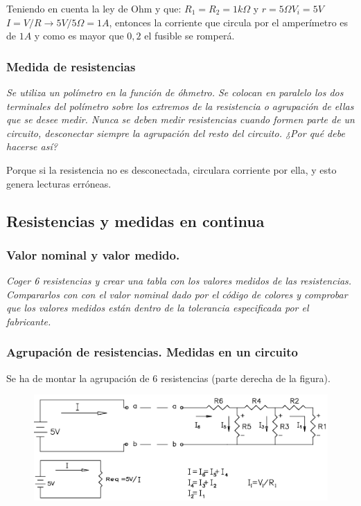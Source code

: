 \documentclass[paper=a4, fontsize=11pt]{scrartcl} %
\numberwithin{equation}{section} %
\numberwithin{figure}{section} %
\numberwithin{table}{section} %
\begin{document}
Teniendo en cuenta la ley de Ohm y que: $R_{1}=R_{2}=1k\Omega$ y $r =5\Omega V_{i}=5V$ \newline
$I=V/R \rightarrow 5V/5\Omega=1A$, entonces la corriente que circula por el amperímetro es de $1A$ y como es mayor que $0,2$ el fusible se romperá. \newline

\subsubsection{Medida de resistencias} 

\textit{Se utiliza un polímetro en la función de óhmetro. Se colocan en paralelo los dos terminales del polímetro sobre los extremos de la resistencia o agrupación de ellas que se desee medir. Nunca se deben medir resistencias cuando formen parte de un circuito, desconectar siempre la agrupación del resto del circuito. ¿Por qué debe hacerse así?} \newline

Porque si la resistencia no es desconectada, circulara corriente por ella, y esto genera lecturas erróneas. \newpage

\subsection{Resistencias y medidas en continua}

\subsubsection{Valor nominal y valor medido.} 

\textit{Coger 6 resistencias y crear una tabla con los valores medidos de las resistencias. Compararlos con con el valor nominal dado por el código de colores y comprobar que los valores medidos están dentro de la tolerancia especificada por el fabricante.} \newline

\subsubsection{Agrupación de resistencias. Medidas en un circuito} 

Se ha de montar la agrupación de 6 resistencias (parte derecha de la figura).
\begin{figure}[h]
	\centering
	\includegraphics[scale=1]{image/agrupacion-resistencia}
\end{figure}
\end{document}
